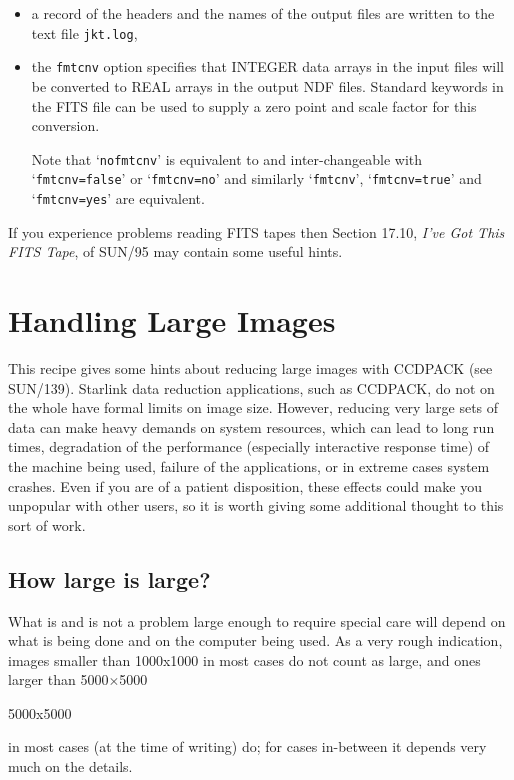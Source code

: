 \documentclass[twoside,11pt]{article}
\newenvironment{latexonly}{}{}
\newcommand{\xref}[3]{#1}
\newcommand{\xlabel}[1]{}
\begin{document}
\begin{description}
\begin{itemize}
    \item a record of the headers and the names of the output files are
     written to the text file {\tt jkt.log},

    \item the {\tt fmtcnv} option specifies that INTEGER data arrays
     in the input files will be converted to REAL arrays in the output
     NDF files.  Standard keywords in the FITS file can be used to supply
     a zero point and scale factor for this conversion.

     Note that `{\tt nofmtcnv}' is equivalent to and inter-changeable with
     `{\tt fmtcnv=false}' or `{\tt fmtcnv=no}' and similarly `{\tt fmtcnv}',
     `{\tt fmtcnv=true}' and `{\tt fmtcnv=yes}' are equivalent.

  \end{itemize}

\end{description}

If you experience problems reading FITS tapes then Section 17.10, 
\xref{{\it I've Got This FITS Tape}}{sun95}{se_fitsunixtape},
of \xref{SUN/95}{sun95}{}\/\cite{SUN95} may contain some useful hints.


\newpage
\section{\xlabel{LARGE}\label{LARGE}Handling Large Images}


This recipe gives some hints about reducing large images with CCDPACK
(see \xref{SUN/139}{sun139}{}\/\cite{SUN139}).
Starlink data reduction applications, such as CCDPACK, do not on the whole
have formal limits on image size.  However,
reducing very large sets of data can make heavy demands 
on system resources, which
can lead to long run times, degradation of the performance
(especially interactive response time)
of the machine being used,
failure of the applications,
or in extreme cases system crashes.
Even if you are of a patient disposition, 
these effects could make you unpopular with other users,
so it is worth giving some additional thought to this sort of work.

\subsection{\xlabel{HOWLARGE}How large is large?}

What is and is not a problem large enough to require special care
will depend on what is being done and on
the computer being used.
As a very rough indication, images smaller than 1000x1000
in most cases do not
count as large, and ones larger than 
\begin{latexonly} 
5000$\times$5000 
\end{latexonly}
\begin{htmlonly} 
5000x5000 
\end{htmlonly}
in most cases (at the time of writing) do;
for cases in-between it depends very much on the details.
\end{document}

